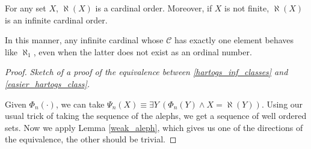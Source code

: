 \begin{lemma}
	For any set $X$, $\aleph(X)$ is a cardinal order. Moreover, if $X$ is not finite, $\aleph(X)$ is an infinite cardinal order.
\end{lemma}

In this manner, any infinite cardinal whose $\mathcal{C}$ has exactly one element behaves like $\aleph_1$, even when the latter does not exist as an ordinal number.

\begin{proof}
	\emph{Sketch of a proof of the equivalence between \ref{hartogs_inf_classes} and \ref{easier_hartogs_class}.}
	
	Given $\Phi_n (\cdot)$, we can take $\Psi_n (X) \equiv \exists Y \ (\Phi_n (Y) \land X = \aleph(Y))$. Using our usual trick of taking the sequence of the alephs, we get a sequence of well ordered sets. Now we apply Lemma \ref{weak_aleph}, which gives us one of the directions of the equivalence, the other should be trivial.
\end{proof}



\printindex
